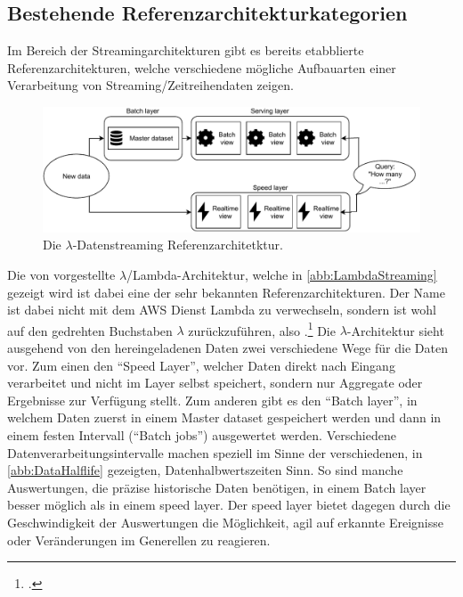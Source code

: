 \subsection{Bestehende Referenzarchitekturkategorien}
Im Bereich der Streamingarchitekturen gibt es bereits etabblierte Referenzarchitekturen, welche verschiedene mögliche Aufbauarten einer Verarbeitung von Streaming/Zeitreihendaten zeigen.

\begin{figure}[H]
\centering
\includegraphics[width=\textwidth]{graphics/Lambda-Reference-Architecture.pdf}
\caption[Die $\lambda$-Datenstreaming Referenzarchitetktur]{Die $\lambda$-Datenstreaming Referenzarchitetktur.\footnotemark}
\label{abb:LambdaStreaming}
\end{figure}

Die von \citeauthor{Marz.2015} vorgestellte $\lambda$/Lambda-Architektur, welche in \autoref{abb:LambdaStreaming} gezeigt wird ist dabei eine der sehr bekannten Referenzarchitekturen. 
Der Name ist dabei nicht mit dem \ac{AWS} Dienst Lambda zu verwechseln, sondern ist wohl auf den gedrehten Buchstaben $\lambda$ zurückzuführen, also .\footcite[Vgl. auch im Folgenden][]{Berle.27.11.2017} Die $\lambda$-Architektur sieht ausgehend von den hereingeladenen Daten zwei verschiedene Wege für die Daten vor. 
Zum einen den \enquote{Speed Layer}, welcher Daten direkt nach Eingang verarbeitet und nicht im Layer selbst speichert, sondern nur Aggregate oder Ergebnisse zur Verfügung stellt. Zum anderen gibt es den \enquote{Batch layer}, in welchem Daten zuerst in einem Master dataset gespeichert werden und dann in einem festen Intervall (\enquote{Batch jobs}) ausgewertet werden. 
Verschiedene Datenverarbeitungsintervalle machen speziell im Sinne der verschiedenen, in \autoref{abb:DataHalflife} gezeigten, Datenhalbwertszeiten Sinn. So sind manche Auswertungen, die präzise historische Daten benötigen, in einem Batch layer besser möglich als in einem speed layer. Der speed layer bietet dagegen durch die Geschwindigkeit der Auswertungen die Möglichkeit, agil auf erkannte Ereignisse oder Veränderungen im Generellen zu reagieren.


